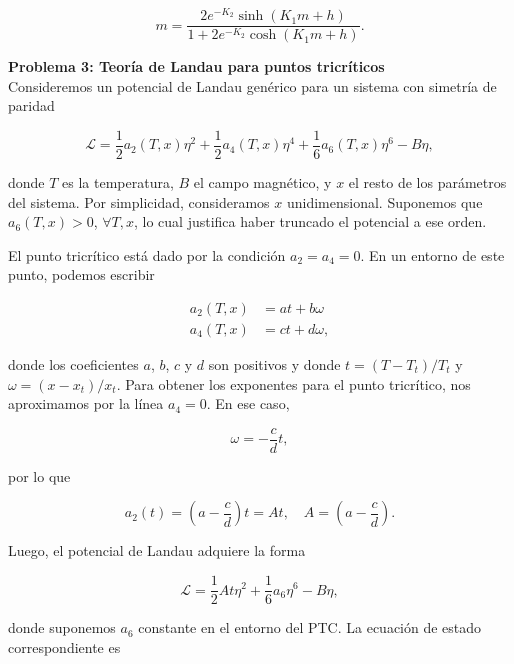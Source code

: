 \documentclass[10pt]{article}
\begin{document}
\begin{equation}
m = \dfrac{2e^{-K_2}\sinh\left( K_1 m + h \right)}{1+2e^{-K_2}\cosh\left( K_1 m + h \right)}.
\end{equation}

\pagebreak

\textbf{Problema 3: Teor\'ia de Landau para puntos tricr\'iticos}
\\

Consideremos un potencial de Landau gen\'erico para un sistema con simetr\'ia de paridad

\begin{equation}
\mathcal{L} = \dfrac{1}{2} a_2(T,x) \eta^2 + \dfrac{1}{2} a_4(T,x) \eta^4 + \dfrac{1}{6} a_6(T,x) \eta^6 - B \eta,
\end{equation}

donde $T$ es la temperatura, $B$ el campo magn\'etico, y $x$ el resto de los par\'ametros del sistema. Por simplicidad, consideramos $x$ unidimensional. Suponemos que $a_6(T,x) >0$, $\forall T,x$, lo cual justifica haber truncado el potencial a ese orden.

El punto tricr\'itico est\'a dado por la condici\'on $a_2 = a_4 = 0$. En un entorno de este punto, podemos escribir

\begin{align}
a_2(T,x) &= at + b\omega \\
a_4(T,x) &= ct + d\omega,
\end{align}

donde los coeficientes $a$, $b$, $c$ y $d$ son positivos y donde $t = (T - T_t)/T_t$ y $\omega = (x-x_t)/x_t$. Para obtener los exponentes para el punto tricr\'itico, nos aproximamos por la l\'inea $a_4 = 0$. En ese caso,

\begin{equation}
\omega = -\dfrac{c}{d}t,
\end{equation}

por lo que

\begin{equation}
a_2(t) = \left( a - \dfrac{c}{d}\right) t = A t,\quad A =  \left( a - \dfrac{c}{d}\right).
\end{equation}

Luego, el potencial de Landau adquiere la forma

\begin{equation}
\mathcal{L} = \dfrac{1}{2} A t \eta^2 + \dfrac{1}{6} a_6 \eta^6 - B \eta,
\end{equation}

donde suponemos $a_6$ constante en el entorno del PTC. La ecuaci\'on de estado correspondiente es 
\end{document}
